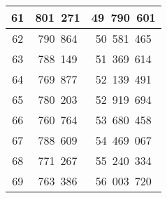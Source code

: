 \begin{center}
\begin{tabular}{|c|c|c|}
          61  &  801~271  &  49~790~601 \\ \hline
          62  &  790~864  &  50~581~465 \\ \hline
          63  &  788~149  &  51~369~614 \\ \hline
          64  &  769~877  &  52~139~491 \\ \hline
          65  &  780~203  &  52~919~694 \\ \hline
          66  &  760~764  &  53~680~458 \\ \hline
          67  &  788~609  &  54~469~067 \\ \hline
          68  &  771~267  &  55~240~334 \\ \hline
          69  &  763~386  &  56~003~720 \\ \hline
     \end{tabular}
\end{center}
\newpage
